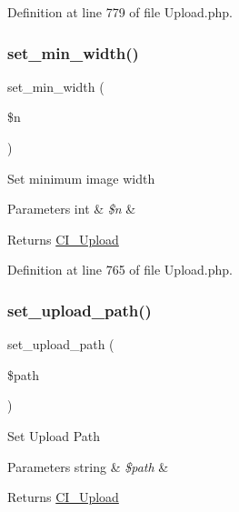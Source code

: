 Definition at line 779 of file Upload.\+php.

\mbox{\label{class_c_i___upload_afe47751e024dc9bf07333060628e0fb4}} 
\subsubsection{\texorpdfstring{set\_min\_width()}{set\_min\_width()}}
{\footnotesize\ttfamily set\+\_\+min\+\_\+width (\begin{DoxyParamCaption}\item[{}]{\$n }\end{DoxyParamCaption})}

Set minimum image width


\begin{DoxyParams}[1]{Parameters}
int & {\em \$n} & \\
\hline
\end{DoxyParams}
\begin{DoxyReturn}{Returns}
\mbox{\hyperlink{class_c_i___upload}{C\+I\+\_\+\+Upload}} 
\end{DoxyReturn}


Definition at line 765 of file Upload.\+php.

\mbox{\label{class_c_i___upload_ab2407f3a942d9b203f54e21194cf040d}} 
\subsubsection{\texorpdfstring{set\_upload\_path()}{set\_upload\_path()}}
{\footnotesize\ttfamily set\+\_\+upload\+\_\+path (\begin{DoxyParamCaption}\item[{}]{\$path }\end{DoxyParamCaption})}

Set Upload Path


\begin{DoxyParams}[1]{Parameters}
string & {\em \$path} & \\
\hline
\end{DoxyParams}
\begin{DoxyReturn}{Returns}
\mbox{\hyperlink{class_c_i___upload}{C\+I\+\_\+\+Upload}} 
\end{DoxyReturn}


